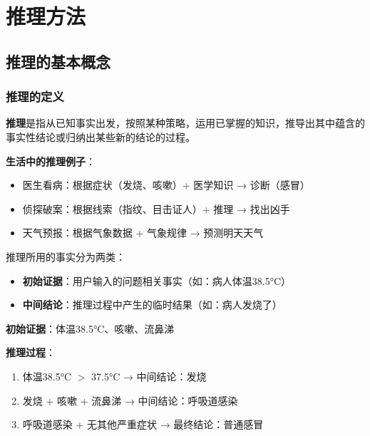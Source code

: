 \chapter{推理方法}

\section{推理的基本概念}

\subsection{推理的定义}
\begin{conceptbox}
\textbf{推理}是指从已知事实出发，按照某种策略，运用已掌握的知识，推导出其中蕴含的事实性结论或归纳出某些新的结论的过程。
\end{conceptbox}

\textbf{生活中的推理例子}：
\begin{itemize}[leftmargin=2em,itemsep=0pt]
    \item 医生看病：根据症状（发烧、咳嗽）+ 医学知识 → 诊断（感冒）
    \item 侦探破案：根据线索（指纹、目击证人）+ 推理 → 找出凶手
    \item 天气预报：根据气象数据 + 气象规律 → 预测明天天气
\end{itemize}

推理所用的事实分为两类：
\begin{itemize}[leftmargin=2em,itemsep=0pt]
    \item \textbf{初始证据}：用户输入的问题相关事实（如：病人体温38.5°C）
    \item \textbf{中间结论}：推理过程中产生的临时结果（如：病人发烧了）
\end{itemize}

\begin{examplebox}[例子：医疗诊断推理过程]
\textbf{初始证据}：体温38.5°C、咳嗽、流鼻涕

\textbf{推理过程}：
\begin{enumerate}[itemsep=0pt]
    \item 体温38.5°C $>$ 37.5°C → 中间结论：发烧
    \item 发烧 + 咳嗽 + 流鼻涕 → 中间结论：呼吸道感染
    \item 呼吸道感染 + 无其他严重症状 → 最终结论：普通感冒
\end{enumerate}
\end{examplebox}

